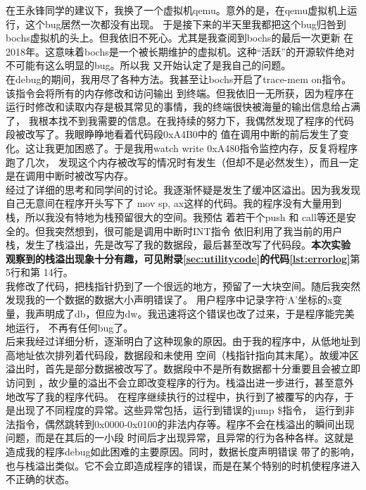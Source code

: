 \documentclass[a4paper]{article}
\newcommand{\codev}[1]{\textsf{#1}}
\begin{document}
    在王永锋同学的建议下，我换了一个虚拟机qemu。意外的是，在qemu虚拟机上运行，这个bug居然一次都没有出现。
    于是接下来的半天里我都把这个bug归咎到bochs虚拟机的头上。但我依旧不死心。尤其是我查阅到bochs的最后一次更新
    在2018年。这意味着bochs是一个被长期维护的虚拟机。这种``活跃''的开源软件绝对不可能有这么明显的bug。所以我
    又开始认定了是我自己的问题。\\
    
    在debug的期间，我用尽了各种方法。我甚至让bochs开启了trace-mem on指令。该指令会将所有的内存修改和访问输出
    到终端。但我依旧一无所获，因为程序在运行时修改和读取内存是极其常见的事情，我的终端很快被海量的输出信息给占满了，
    我根本找不到我需要的信息。在我持续的努力下，我偶然发现了程序的代码段被改写了。我眼睁睁地看着代码段0xA4B0中的
    值在调用中断的前后发生了变化。这让我更加困惑了。于是我用watch write 0xA480指令监控内存，反复将程序跑了几次，
    发现这个内存被改写的情况时有发生（但却不是必然发生），而且一定是在调用中断时被改写内存。\\
    
    经过了详细的思考和同学间的讨论。我逐渐怀疑是发生了缓冲区溢出。因为我发现自己无意间在程序开头写下了
    \codev{mov sp, ax}这样的代码。我的程序没有大量用到栈，所以我没有特地为栈预留很大的空间。我预估
    着若干个\codev{push} 和 \codev{call}等还是安全的。但我突然想到，很可能是调用中断时INT指令
    依旧利用了我当前的用户栈，发生了栈溢出，先是改写了我的数据段，最后甚至改写了代码段。\textbf{本次实验
    观察到的栈溢出现象十分有趣，可见附录\ref{sec:utilitycode}的代码\ref{lst:errorlog}}第5行和第
    14行。\\
    
    我修改了代码，把栈指针扔到了一个很远的地方，预留了一大块空间。随后我突然发现我的一个数据的数据大小声明错误了。
    用户程序中记录字符`A'坐标的x变量，我声明成了db，但应为dw。我迅速将这个错误也改了过来，于是程序能完美地运行，
    不再有任何bug了。 \\
    
    后来我经过详细分析，逐渐明白了这种现象的原因。由于我的程序中，从低地址到高地址依次排列着代码段，数据段和未使用
    空间（栈指针指向其末尾）。故缓冲区溢出时，首先是部分数据被改写了。数据段中不是所有数据都十分重要且会被立即访问到
    ，故少量的溢出不会立即改变程序的行为。栈溢出进一步进行，甚至意外地改写了我的程序代码。
    在程序继续执行的过程中，执行到了被覆写的内存，于是出现了不同程度的异常。这些异常包括，运行到错误的jump \$指令，
    运行到非法指令，偶然跳转到0x0000-0x0100的非法内存等。程序不会在栈溢出的瞬间出现问题，而是在其后的一小段
    时间后才出现异常，且异常的行为各种各样。这就是造成我的程序debug如此困难的主要原因。同时，数据长度声明错误
    带了的影响，也与栈溢出类似。它不会立即造成程序的错误，而是在某个特别的时机使程序进入不正确的状态。
\end{document}

